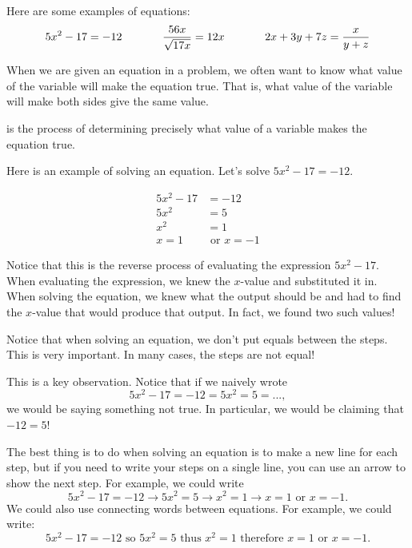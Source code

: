 \documentclass{ximera}
\begin{document}
Here are some examples of equations:
$$
5x^2-17=-12  \hspace{.5in}
\frac{56x}{\sqrt{17x}}=12x  \hspace{.5in}
2x+3y+7z=\frac{x}{y+z}
$$

When we are given an equation in a problem, we often want to know what value of the variable will make the equation true.  That is, what value of the variable will make both sides give the same value.

\begin{definition}
 is the process of determining precisely what value of a variable makes the equation true.
\end{definition}

Here is an example of solving an equation.  Let's solve $5x^2-17=-12$.

\begin{align*}
5x^2-17&=-12\\
5x^2&=5\\
x^2&=1\\
x=1 &\text{  or  }  x=-1
\end{align*}

Notice that this is the reverse process of evaluating the expression $5x^2-17$.  When evaluating the expression, we knew the $x$-value and substituted it in.  When solving the equation, we knew what the output should be and had to find the $x$-value that would produce that output.  In fact, we found two such values!

\begin{remark}
Notice that when solving an equation, we don't put equals between the steps.  This is very important.  In many cases, the steps are not equal! 
\end{remark}

This is a key observation.  Notice that if we naively wrote $$5x^2-17=-12=5x^2=5=...,$$ we would be saying something not true.  In particular, we would be claiming that $-12=5$!

The best thing is to do when solving an equation is to make a new line for each step, but if you need to write your steps on a single line, you can use an arrow to show the next step.  For example, we could write 
$$5x^2-17=-12 \rightarrow 5x^2=5 \rightarrow x^2=1 \rightarrow x=1 \text{  or  }  x=-1.$$  
We could also use connecting words between equations.  For example, we could write:
$$5x^2-17=-12 \text{ so } 5x^2=5 \text{ thus } x^2=1 \text{ therefore } x=1 \text{  or  }  x=-1.$$  
\end{document}
